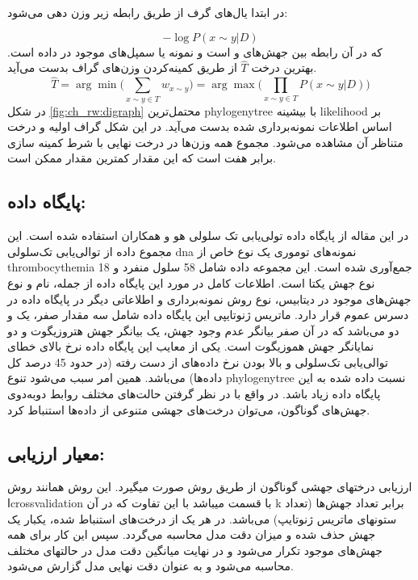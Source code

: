 در ابتدا یال‌های گرف از طریق رابطه زیر وزن دهی می‌شود:

\begin{equation}
	-\log P(x\sim y| D)
\end{equation}
که در آن  رابطه بین جهش‌های  و  است و  نمونه یا سمپل‌های موجود در داده است. بهترین درخت $\hat{T}$  از طریق کمینه‌کردن وزن‌های گراف بدست می‌آید.
\begin{equation}
	\hat{T} = \arg \min\Big( \sum_{x\sim y \in T} w_{x\sim y} \Big)= \arg \max \Big( \prod_{x\sim y \in T} P(x\sim y | D) \Big )
\end{equation}
در شکل \ref{fig:ch_rw:digraph} محتمل‌ترین \gls{phylogenytree} با بیشینه \gls{likelihood} بر اساس اطلاعات نمونه‌برداری شده بدست می‌آید. در این شکل گراف اولیه و درخت متناظر آن مشاهده می‌شود. مجموع همه وزن‌ها در درخت نهایی با شرط کمینه سازی برابر هفت است که این مقدار کمترین مقدار ممکن است. 


\subsection{پایگاه داده:}

در این مقاله از پایگاه داده تولی‌یابی تک سلولی هو‌ و همکاران \cite{hou2012single} استفاده شده است. این مجموع داده از توالی‌یابی تک‌سلولی \gls{dna} نمونه‌های توموری یک نوع خاص از \gls{thrombocythemia} جمع‌آوری شده است. این مجموعه داده شامل 58 سلول منفرد و 18 نوع جهش یکتا است. اطلاعات کامل در مورد این پایگاه داده از جمله، نام و نوع جهش‌های موجود در دیتابیس، نوع روش نمونه‌برداری و اطلاعاتی دیگر در پایگاه داده  در دسرس عموم قرار دارد. ماتریس ژنوتایپی این پایگاه داده شامل سه مقدار صفر، یک و دو می‌باشد که در آن صفر بیانگر عدم وجود جهش،  یک بیانگر جهش هتروزیگوت و دو نمایانگر جهش هموزیگوت است. یکی از معایب این پایگاه داده نرخ بالای خطای توالی‌یابی تک‌سلولی و بالا‌ بودن نرخ داده‌های از دست رفته (در حدود 45 درصد کل داده‌ها) می‌باشد. همین امر سبب می‌شود تنوع \gls{phylogenytree} نسبت داده شده به این پایگاه داده زیاد باشد. در واقع با در نظر گرفتن حالت‌های مختلف روابط دو‌به‌دوی جهش‌های گوناگون، می‌توان درخت‌های جهشی متنوعی از داده‌ها استنباط کرد. 

\subsection{معیار ارزیابی: }

ارزیابی درختهای جهشی گوناگون از طریق روش  صورت میگیرد. این روش همانند روش ا\gls{crossvalidation} با  قسمت میباشد با این تفاوت که در آن k برابر تعداد جهش‌ها (تعداد ستونهای ماتریس ژنوتایپ) می‌باشد. در هر یک از درخت‌های استنباط شده، یکبار یک جهش حذف شده و میزان دقت مدل محاسبه می‌گردد. سپس این کار برای همه جهش‌های موجود تکرار می‌شود و در نهایت میانگین دقت مدل در حالتهای مختلف محاسبه می‌شود و به عنوان دقت نهایی مدل گزارش می‌شود.  

